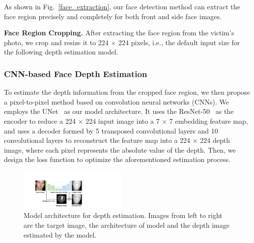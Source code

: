 As shown in Fig.~\ref{face_extraction},  our face detection method can extract the face region precisely and completely for both front and side face images.

\textbf{Face Region Cropping.} 
After extracting the face region from the victim's photo, we crop and resize it to 224 $\times$ 224 pixels, i.e., the default input size for the following depth estimation model.

\subsubsection{CNN-based Face Depth Estimation}
To estimate the depth information from the cropped face region, we then propose a pixel-to-pixel method based on convolution neural networks (CNNs). We employs the UNet~\cite{ronneberger2015u} as our model architecture. It uses the  ResNet-50~\cite{he2016deep} as the encoder to reduce a 224 $\times$ 224 input image into a 7 $\times$ 7 embedding feature map, and uses a decoder formed by 5 transposed convolutional layers and 10 convolutional layers to reconstruct the feature map into a 224 $\times$ 224 depth image, where each pixel represents the absolute value of the depth.  Then, we design the loss function to optimize the aforementioned estimation process.


\begin{figure}[!t]
	\centering
	\includegraphics[width=0.47\textwidth]{figures/model_architecture_1.pdf} 
	\vspace{-0.15in}
	\caption{Model architecture for depth estimation. Images from left to right are the target image, the architecture of model and the depth image estimated by the model.}
	\label{model_architecture}
	\vspace{-0.15in}
\end{figure}

